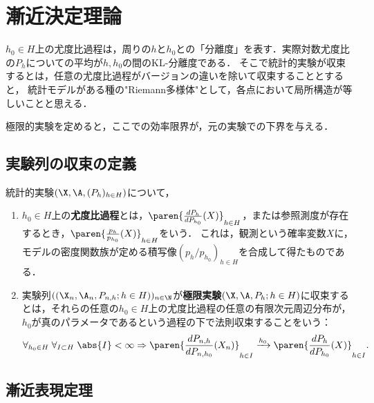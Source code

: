 \documentclass[uplatex,dvipdfmx]{jsreport}
\begin{document}
\section{漸近決定理論}

\begin{tcolorbox}[colframe=ForestGreen, colback=ForestGreen!10!white,breakable,colbacktitle=ForestGreen!40!white,coltitle=black,fonttitle=\bfseries\sffamily,
title=]
    $h_0\in H$上の尤度比過程は，周りの$h$と$h_0$との「分離度」を表す．実際対数尤度比の$P_h$についての平均が$h,h_0$の間のKL-分離度である．
    そこで統計的実験が収束するとは，任意の尤度比過程がバージョンの違いを除いて収束することとすると，
    統計モデルがある種の"Riemann多様体"として，各点において局所構造が等しいことと思える．

    極限的実験を定めると，ここでの効率限界が，元の実験での下界を与える．
\end{tcolorbox}

\subsection{実験列の収束の定義}

\begin{definition}
    統計的実験$(\X,\A,(P_h)_{h\in H})$について，
    \begin{enumerate}
    \item $h_0\in H$上の\textbf{尤度比過程}とは，$\paren{\frac{dP_{h}}{dP_{h_0}}(X)}_{h\in H}$，または参照測度が存在するとき，$\paren{\frac{p_h}{p_{h_0}}(X)}_{h\in H}$をいう．
    これは，観測という確率変数$X$に，モデルの密度関数族が定める積写像$(p_h/p_{h_0})_{h\in H}$を合成して得たものである．
    \item 実験列$((\X_n,\A_n,P_{n,h};h\in H))_{n\in\N}$が\textbf{極限実験}$(\X,\A,P_h;h\in H)$に収束するとは，それらの任意の$h_0\in H$上の尤度比過程の任意の有限次元周辺分布が，$h_0$が真のパラメータであるという過程の下で法則収束することをいう：
    \[\forall_{h_0\in H}\;\forall_{I\subset H}\;\abs{I}<\infty\Rightarrow\paren{\frac{dP_{n,h}}{dP_{n,h_0}}(X_n)}_{h\in I}\xrightarrow{h_0}\paren{\frac{dP_h}{dP_{h_0}}(X)}_{h\in I}.\]
    \end{enumerate}
\end{definition}

\subsection{漸近表現定理}
\end{document}
